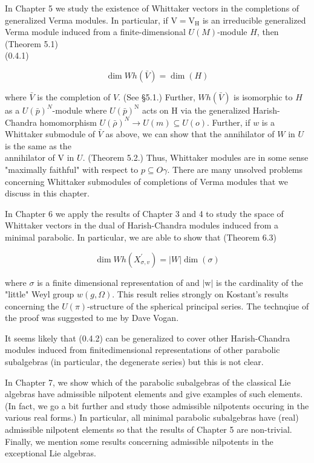 \documentclass[10pt]{article}
\begin{document}
In Chapter 5 we study the existence of Whittaker vectors in the completions of generalized Verma modules. In particular, if $\mathrm{V}=\mathrm{V}_{\mathrm{H}}$ is an irreducible generalized Verma module induced from a finite-dimensional $U(M)$-module $H$, then (Theorem 5.1)\\
(0.4.1)

$$
\operatorname{dim} W h(\bar{V})=\operatorname{dim}(H)
$$

where $\bar{V}$ is the completion of $V$. (See §5.1.) Further, $W h(\bar{V})$ is isomorphic to $H$ as a $U(\bar{p})^{N}$-module where $U(\bar{p})^{\mathrm{N}}$ acts on H via the generalized Harish-Chandra homomorphism $U(\bar{\rho})^{N} \rightarrow U(m) \subseteq U(o)$. Further, if $w$ is a Whittaker submodule of $\bar{V}$ as above, we can show that the annihilator of $W$ in $U$ is the same as the\\
annihilator of V in $U$. (Theorem 5.2.) Thus, Whittaker modules are in some sense "maximally faithful" with respect to $p \subseteq O \gamma$. There are many unsolved problems concerning Whittaker submodules of completions of Verma modules that we discuss in this chapter.

In Chapter 6 we apply the results of Chapter 3 and 4 to study the space of Whittaker vectors in the dual of Harish-Chandra modules induced from a minimal parabolic. In particular, we are able to show that (Theorem 6.3)


\begin{equation*}
\operatorname{dim} W h\left(X_{\sigma, v}^{\prime}\right)=|W| \operatorname{dim}(\sigma) \tag{0.4.2}
\end{equation*}


where $\sigma$ is a finite dimensional representation of and $|\mathrm{w}|$ is the cardinality of the "little" Weyl group $w(g, \Omega)$. This result relies strongly on Kostant's results concerning the $U(\pi)$-structure of the spherical principal series. The technqiue of the proof was suggested to me by Dave Vogan.

It seems likely that (0.4.2) can be generalized to cover other Harish-Chandra modules induced from finitedimensional representations of other parabolic subalgebras (in particular, the degenerate series) but this is not clear.

In Chapter 7, we show which of the parabolic subalgebras of the classical Lie algebras have admissible nilpotent elements and give examples of such elements. (In fact, we go a bit further and study those admissible nilpotents occuring in the various real forms.) In particular, all minimal parabolic subalgebras have (real) admissible nilpotent elements so that the results of Chapter 5 are non-trivial. Finally, we mention some results concerning admissible nilpotents in the exceptional Lie algebras.
\end{document}
